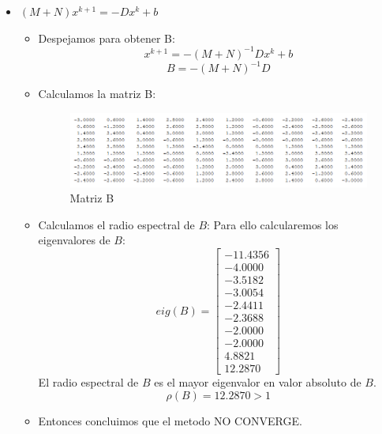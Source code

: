 \begin{itemize}
    
    \item $(M+N)x^{k+1}=-Dx^k + b$
    \begin{itemize}
        \item Despejamos para obtener B:
        $$x^{k+1}=-(M+N)^{-1}Dx^k + b$$ 
        $$B=-(M+N)^{-1}D$$
    \item Calculamos la matriz B:
    \begin{figure}[H]
                \centering
                \includegraphics[width=1.1\textwidth]{matrix_images/b3.PNG}
                \caption{Matriz B}
        \end{figure}
    \item Calculamos el radio espectral de $B$:
    Para ello calcularemos los eigenvalores de $B$:
    $$eig(B)=\begin{bmatrix}
            -11.4356\\
           -4.0000\\
           -3.5182\\
           -3.0054\\
           -2.4411\\
           -2.3688\\
           -2.0000\\
           -2.0000\\
            4.8821\\
   12.2870
    \end{bmatrix}
    $$
    El radio espectral de $B$ es el mayor eigenvalor en valor absoluto de $B$.
    $$\rho (B) = 12.2870>1$$
    \item Entonces concluimos que el metodo NO CONVERGE.
    \end{itemize}
\end{itemize}